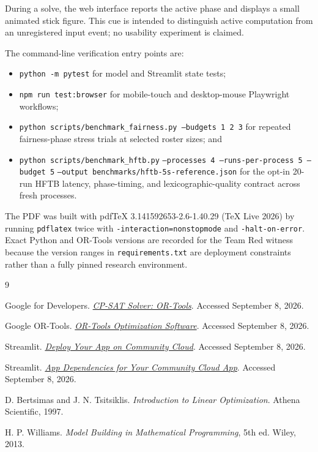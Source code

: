\documentclass[11pt]{article}
\newcommand{\code}[1]{\texttt{#1}}
\begin{document}
During a solve, the web interface reports the active phase and displays a small
animated stick figure. This cue is intended to distinguish active computation
from an unregistered input event; no usability experiment is claimed.

The command-line verification entry points are:
\begin{itemize}
    \item \code{python -m pytest} for model and Streamlit state tests;
    \item \code{npm run test:browser} for mobile-touch and desktop-mouse
    Playwright workflows;
    \item \code{python scripts/benchmark\_fairness.py --budgets 1 2 3}
    for repeated fairness-phase stress trials at selected roster sizes; and
    \item \code{python scripts/benchmark\_hftb.py}\newline
    \code{--processes 4 --runs-per-process 5 --budget 5}\newline
    \code{--output benchmarks/hftb-5s-reference.json} for the opt-in 20-run HFTB latency,
    phase-timing, and lexicographic-quality contract across fresh processes.
\end{itemize}

The PDF was built with pdfTeX 3.141592653-2.6-1.40.29 (TeX Live 2026) by running
\code{pdflatex} twice with \code{-interaction=nonstopmode} and
\code{-halt-on-error}. Exact Python and OR-Tools versions are recorded for the
Team Red witness because the version ranges in \code{requirements.txt} are
deployment constraints rather than a fully pinned research environment.

\begingroup
\small
\setlength{\parskip}{2pt}
\begin{thebibliography}{9}

Google for Developers.
\href{https://developers.google.com/optimization/cp/cp_solver}
{\emph{CP-SAT Solver: OR-Tools}}. Accessed September 8, 2026.

Google OR-Tools.
\href{https://developers.google.com/optimization}
{\emph{OR-Tools Optimization Software}}. Accessed September 8, 2026.

Streamlit.
\href{https://docs.streamlit.io/deploy/streamlit-community-cloud/deploy-your-app/deploy}
{\emph{Deploy Your App on Community Cloud}}. Accessed September 8, 2026.

Streamlit.
\href{https://docs.streamlit.io/deploy/streamlit-community-cloud/deploy-your-app/app-dependencies}
{\emph{App Dependencies for Your Community Cloud App}}. Accessed September 8,
2026.

D. Bertsimas and J. N. Tsitsiklis.
\emph{Introduction to Linear Optimization}. Athena Scientific, 1997.

H. P. Williams.
\emph{Model Building in Mathematical Programming}, 5th ed. Wiley, 2013.

\end{thebibliography}
\endgroup
\end{document}
